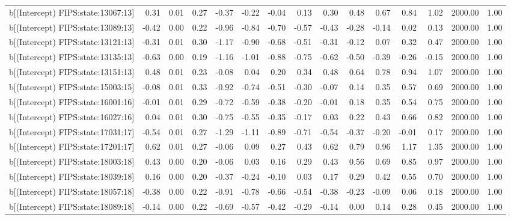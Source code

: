 \begin{table}[ht]
\begin{tabular}{rrrrrrrrrrrrrrr}
  b[(Intercept) FIPS:state:13067:13] & 0.31 & 0.01 & 0.27 & -0.37 & -0.22 & -0.04 & 0.13 & 0.30 & 0.48 & 0.67 & 0.84 & 1.02 & 2000.00 & 1.00 \\ 
  b[(Intercept) FIPS:state:13089:13] & -0.42 & 0.00 & 0.22 & -0.96 & -0.84 & -0.70 & -0.57 & -0.43 & -0.28 & -0.14 & 0.02 & 0.13 & 2000.00 & 1.00 \\ 
  b[(Intercept) FIPS:state:13121:13] & -0.31 & 0.01 & 0.30 & -1.17 & -0.90 & -0.68 & -0.51 & -0.31 & -0.12 & 0.07 & 0.32 & 0.47 & 2000.00 & 1.00 \\ 
  b[(Intercept) FIPS:state:13135:13] & -0.63 & 0.00 & 0.19 & -1.16 & -1.01 & -0.88 & -0.75 & -0.62 & -0.50 & -0.39 & -0.26 & -0.15 & 2000.00 & 1.00 \\ 
  b[(Intercept) FIPS:state:13151:13] & 0.48 & 0.01 & 0.23 & -0.08 & 0.04 & 0.20 & 0.34 & 0.48 & 0.64 & 0.78 & 0.94 & 1.07 & 2000.00 & 1.00 \\ 
  b[(Intercept) FIPS:state:15003:15] & -0.08 & 0.01 & 0.33 & -0.92 & -0.74 & -0.51 & -0.30 & -0.07 & 0.14 & 0.35 & 0.57 & 0.69 & 2000.00 & 1.00 \\ 
  b[(Intercept) FIPS:state:16001:16] & -0.01 & 0.01 & 0.29 & -0.72 & -0.59 & -0.38 & -0.20 & -0.01 & 0.18 & 0.35 & 0.54 & 0.75 & 2000.00 & 1.00 \\ 
  b[(Intercept) FIPS:state:16027:16] & 0.04 & 0.01 & 0.30 & -0.75 & -0.55 & -0.35 & -0.17 & 0.03 & 0.22 & 0.43 & 0.66 & 0.82 & 2000.00 & 1.00 \\ 
  b[(Intercept) FIPS:state:17031:17] & -0.54 & 0.01 & 0.27 & -1.29 & -1.11 & -0.89 & -0.71 & -0.54 & -0.37 & -0.20 & -0.01 & 0.17 & 2000.00 & 1.00 \\ 
  b[(Intercept) FIPS:state:17201:17] & 0.62 & 0.01 & 0.27 & -0.06 & 0.09 & 0.27 & 0.43 & 0.62 & 0.79 & 0.96 & 1.17 & 1.35 & 2000.00 & 1.00 \\ 
  b[(Intercept) FIPS:state:18003:18] & 0.43 & 0.00 & 0.20 & -0.06 & 0.03 & 0.16 & 0.29 & 0.43 & 0.56 & 0.69 & 0.85 & 0.97 & 2000.00 & 1.00 \\ 
  b[(Intercept) FIPS:state:18039:18] & 0.16 & 0.00 & 0.20 & -0.37 & -0.24 & -0.10 & 0.03 & 0.17 & 0.29 & 0.42 & 0.55 & 0.70 & 2000.00 & 1.00 \\ 
  b[(Intercept) FIPS:state:18057:18] & -0.38 & 0.00 & 0.22 & -0.91 & -0.78 & -0.66 & -0.54 & -0.38 & -0.23 & -0.09 & 0.06 & 0.18 & 2000.00 & 1.00 \\ 
  b[(Intercept) FIPS:state:18089:18] & -0.14 & 0.00 & 0.22 & -0.69 & -0.57 & -0.42 & -0.29 & -0.14 & 0.00 & 0.14 & 0.28 & 0.45 & 2000.00 & 1.00 \\ 

\end{tabular}
\end{table}
